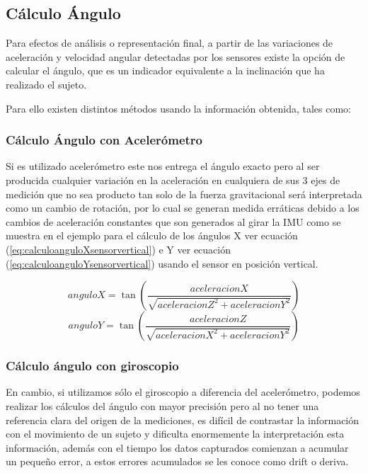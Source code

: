 \documentclass[12pt,a4paper]{article}
\begin{document}
\subsection{Cálculo Ángulo} 
Para efectos de análisis o representación final, a partir de las variaciones de aceleración y velocidad angular detectadas por los sensores existe la opción de calcular el ángulo, que es un indicador equivalente a la inclinación que ha realizado el sujeto.

Para ello existen distintos métodos usando la información obtenida, tales como:


\subsubsection{Cálculo Ángulo con Acelerómetro} Si es utilizado acelerómetro este nos entrega el ángulo exacto pero al ser producida cualquier variación en la aceleración en cualquiera de sus 3 ejes de medición que no sea producto tan solo de la fuerza gravitacional será interpretada como un cambio de rotación, por lo cual se generan medida erráticas debido a los cambios de aceleración constantes que son generados al girar la IMU como se muestra en el ejemplo para el cálculo de los ángulos X ver ecuación (\ref{eq:calculoanguloXsensorvertical}) e Y ver ecuación (\ref{eq:calculoanguloYsensorvertical}) usando el sensor en posición vertical.

\begin{figure}[H]
	\begin{equation}
		anguloX = \tan{\left(\frac{aceleracionX}{\sqrt{aceleracionZ^{2}+aceleracionY^{2}}}\right)}
		\label{eq:calculoanguloXsensorvertical}
	\end{equation}
	\begin{equation}
		anguloY = \tan{\left(\frac{aceleracionZ}{\sqrt{aceleracionX^{2}+aceleracionY^{2}}}\right)}
		\label{eq:calculoanguloYsensorvertical}
	\end{equation}
\end{figure}

\subsubsection{Cálculo ángulo con giroscopio} 
En cambio, si utilizamos sólo el giroscopio a diferencia del acelerómetro, podemos realizar los cálculos del ángulo con mayor precisión pero al no tener una referencia clara del origen de la mediciones, es difícil de contrastar la información con el movimiento de un sujeto y dificulta enormemente la  interpretación esta información, además con el tiempo los datos capturados comienzan a acumular un pequeño error, a estos errores acumulados se les conoce como drift o deriva.
\end{document}
